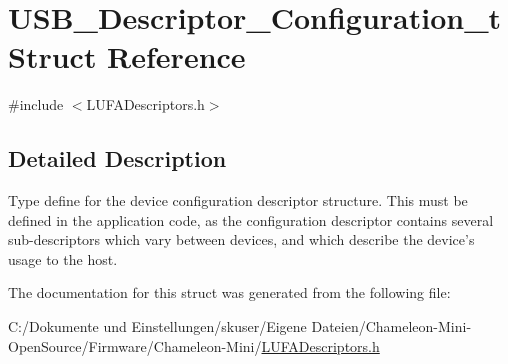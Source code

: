 \hypertarget{struct_u_s_b___descriptor___configuration__t}{\section{U\-S\-B\-\_\-\-Descriptor\-\_\-\-Configuration\-\_\-t Struct Reference}
\label{struct_u_s_b___descriptor___configuration__t}
}


{\ttfamily \#include $<$L\-U\-F\-A\-Descriptors.\-h$>$}



\subsection{Detailed Description}
Type define for the device configuration descriptor structure. This must be defined in the application code, as the configuration descriptor contains several sub-\/descriptors which vary between devices, and which describe the device's usage to the host. 

The documentation for this struct was generated from the following file\-:\begin{DoxyCompactItemize}
\item 
C\-:/\-Dokumente und Einstellungen/skuser/\-Eigene Dateien/\-Chameleon-\/\-Mini-\/\-Open\-Source/\-Firmware/\-Chameleon-\/\-Mini/\hyperlink{_l_u_f_a_descriptors_8h}{L\-U\-F\-A\-Descriptors.\-h}\end{DoxyCompactItemize}
